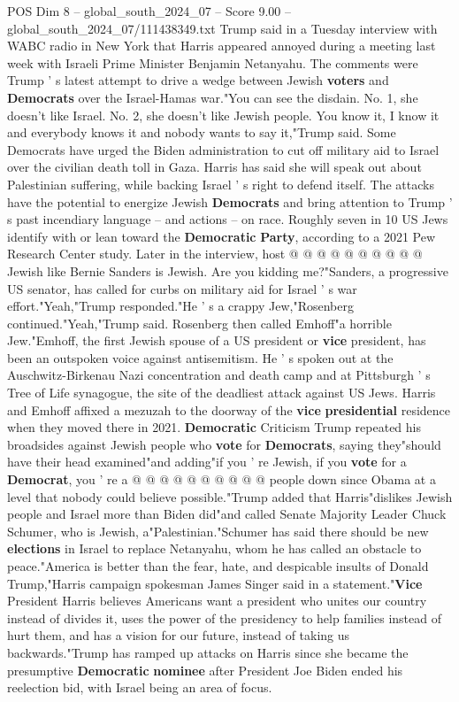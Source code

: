 \begin{textsample}{POS Dim 8 – global\_south\_2024\_07 – Score 9.00 – global\_south\_2024\_07/111438349.txt}  \label{ex:f8_pos_108}
Trump said in a Tuesday interview with WABC radio in New York that Harris appeared annoyed during a meeting last week with Israeli Prime Minister Benjamin Netanyahu.
The comments were Trump ' s latest attempt to drive a wedge between Jewish \textbf{voters} and \textbf{Democrats} over the Israel-Hamas war."You can see the disdain.
No. 1, she doesn't like Israel.
No. 2, she doesn't like Jewish people.
You know it, I know it and everybody knows it and nobody wants to say it,"Trump said.
Some Democrats have urged the Biden administration to cut off military aid to Israel over the civilian death toll in Gaza.
Harris has said she will speak out about Palestinian suffering, while backing Israel ' s right to defend itself.
The attacks have the potential to energize Jewish \textbf{Democrats} and bring attention to Trump ' s past incendiary language -- and actions -- on race.
Roughly seven in 10 US Jews identify with or lean toward the \textbf{Democratic} \textbf{Party}, according to a 2021 Pew Research Center study.
Later in the interview, host @ @ @ @ @ @ @ @ @ @ Jewish like Bernie Sanders is Jewish.
Are you kidding me?"Sanders, a progressive US senator, has called for curbs on military aid for Israel ' s war effort."Yeah,"Trump responded."He ' s a crappy Jew,"Rosenberg continued."Yeah,"Trump said.
Rosenberg then called Emhoff"a horrible Jew."Emhoff, the first Jewish spouse of a US president or \textbf{vice} president, has been an outspoken voice against antisemitism.
He ' s spoken out at the Auschwitz-Birkenau Nazi concentration and death camp and at Pittsburgh ' s Tree of Life synagogue, the site of the deadliest attack against US Jews.
Harris and Emhoff affixed a mezuzah to the doorway of the \textbf{vice} \textbf{presidential} residence when they moved there in 2021. \textbf{Democratic} Criticism Trump repeated his broadsides against Jewish people who \textbf{vote} for \textbf{Democrats}, saying they"should have their head examined"and adding"if you ' re Jewish, if you \textbf{vote} for a \textbf{Democrat}, you ' re a @ @ @ @ @ @ @ @ @ @ people down since Obama at a level that nobody could believe possible."Trump added that Harris"dislikes Jewish people and Israel more than Biden did"and called Senate Majority Leader Chuck Schumer, who is Jewish, a"Palestinian."Schumer has said there should be new \textbf{elections} in Israel to replace Netanyahu, whom he has called an obstacle to peace."America is better than the fear, hate, and despicable insults of Donald Trump,"Harris campaign spokesman James Singer said in a statement."\textbf{Vice} President Harris believes Americans want a president who unites our country instead of divides it, uses the power of the presidency to help families instead of hurt them, and has a vision for our future, instead of taking us backwards."Trump has ramped up attacks on Harris since she became the presumptive \textbf{Democratic} \textbf{nominee} after President Joe Biden ended his reelection bid, with Israel being an area of focus.

\end{textsample}
